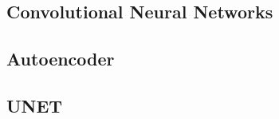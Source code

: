 








\subsection{Convolutional Neural Networks}
\subsection{Autoencoder}
\cite{goodfellowDeepLearning2016}
\subsection{UNET}





